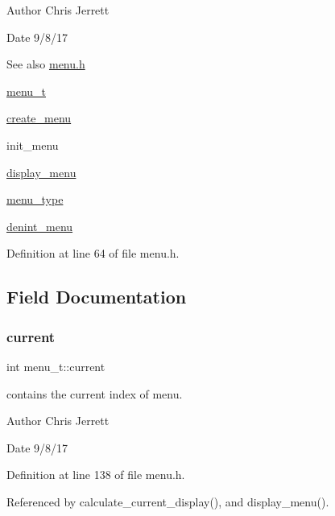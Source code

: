 \begin{DoxyAuthor}{Author}
Chris Jerrett 
\end{DoxyAuthor}
\begin{DoxyDate}{Date}
9/8/17 
\end{DoxyDate}
\begin{DoxySeeAlso}{See also}
\hyperlink{menu_8h}{menu.\+h} 

\hyperlink{structmenu__t}{menu\+\_\+t} 

\hyperlink{menu_8c_adcee778eac0edb821427d32949106dc5}{create\+\_\+menu} 

init\+\_\+menu 

\hyperlink{menu_8c_abfadedb104f89f672dd3045499975a71}{display\+\_\+menu} 

\hyperlink{menu_8h_a6bbf4baf5018b0d76aab6c2e6bf85e62}{menu\+\_\+type} 

\hyperlink{menu_8c_a05a36619ac6c9ba4544eddb83ee2a50d}{denint\+\_\+menu} 
\end{DoxySeeAlso}


Definition at line 64 of file menu.\+h.



\subsection{Field Documentation}
\mbox{\label{structmenu__t_a2acb18066898677ec5e2dc40eec811c5}} 
\subsubsection{\texorpdfstring{current}{current}}
{\footnotesize\ttfamily int menu\+\_\+t\+::current}



contains the current index of menu. 

\begin{DoxyAuthor}{Author}
Chris Jerrett 
\end{DoxyAuthor}
\begin{DoxyDate}{Date}
9/8/17 
\end{DoxyDate}


Definition at line 138 of file menu.\+h.



Referenced by calculate\+\_\+current\+\_\+display(), and display\+\_\+menu().

\mbox{\label{structmenu__t_a023063461c4a247e574abd6a55faf765}} 
